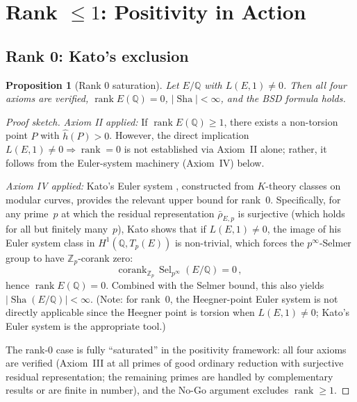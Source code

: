 \documentclass[aps,prd,twocolumn,superscriptaddress,nofootinbib]{revtex4-2}
\newtheorem{proposition}[theorem]{Proposition}
\theoremstyle{definition}
\theoremstyle{remark}
\DeclareMathOperator{\rank}{rank}
\DeclareMathOperator{\Sel}{Sel}
\DeclareMathOperator{\Sha}{Sha}
\begin{document}
\section{Rank $\leq 1$: Positivity in Action}
\label{sec:rank01}

\subsection{Rank 0: Kato's exclusion}

\begin{proposition}[Rank 0 saturation]
\label{prop:rank0}
Let $E/\mathbb{Q}$ with $L(E,1) \neq 0$. Then all four axioms are verified, $\rank E(\mathbb{Q}) = 0$, $|\Sha| < \infty$, and the BSD formula holds.
\end{proposition}

\begin{proof}[Proof sketch]
\textit{Axiom II applied:} If $\rank E(\mathbb{Q}) \geq 1$, there exists a non-torsion point $P$ with $\hat{h}(P) > 0$. However, the direct implication $L(E,1) \neq 0 \Rightarrow \rank = 0$ is not established via Axiom~II alone; rather, it follows from the Euler-system machinery (Axiom~IV) below.

\textit{Axiom IV applied:} Kato's Euler system \cite{Kato2004}, constructed from $K$-theory classes on modular curves, provides the relevant upper bound for rank~0. Specifically, for any prime~$p$ at which the residual representation $\bar{\rho}_{E,p}$ is surjective (which holds for all but finitely many~$p$), Kato shows that if $L(E,1) \neq 0$, the image of his Euler system class in $H^1(\mathbb{Q}, T_p(E))$ is non-trivial, which forces the $p^\infty$-Selmer group to have $\mathbb{Z}_p$-corank zero:
\begin{equation}
\mathrm{corank}_{\mathbb{Z}_p}\, \Sel_{p^\infty}(E/\mathbb{Q}) = 0\,,
\end{equation}
hence $\rank E(\mathbb{Q}) = 0$. Combined with the Selmer bound, this also yields $|\Sha(E/\mathbb{Q})| < \infty$. (Note: for rank~0, the Heegner-point Euler system is not directly applicable since the Heegner point is torsion when $L(E,1) \neq 0$; Kato's Euler system is the appropriate tool.)

The rank-0 case is fully ``saturated'' in the positivity framework: all four axioms are verified (Axiom~III at all primes of good ordinary reduction with surjective residual representation; the remaining primes are handled by complementary results or are finite in number), and the No-Go argument excludes $\rank \geq 1$.
\end{proof}
\end{document}

